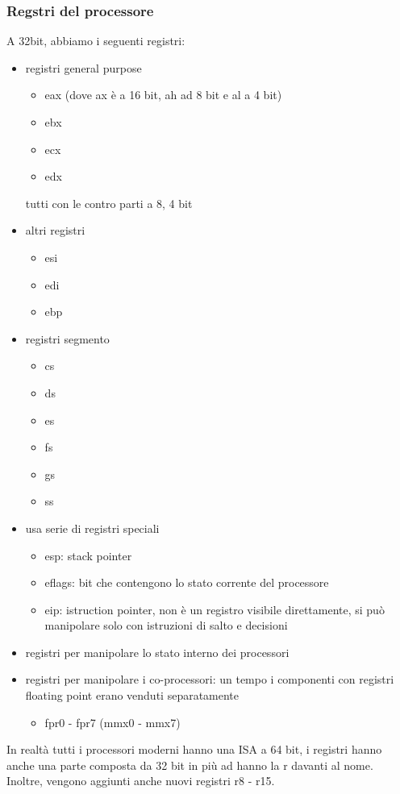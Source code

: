 \documentclass{article}
\begin{document}
\subsubsection{Regstri del processore}
A 32bit, abbiamo i seguenti registri:
\begin{itemize}
\item registri general purpose
\begin{itemize}
\item eax (dove ax è a 16 bit, ah ad 8 bit e al a 4 bit)
\item ebx
\item ecx
\item edx
\end{itemize}
tutti con le contro parti a 8, 4 bit
\item altri registri
\begin{itemize}
\item esi
\item edi
\item ebp
\end{itemize}
\item registri segmento
\begin{itemize}
\item cs
\item ds
\item es
\item fs
\item gs
\item ss
\end{itemize}
\item usa serie di registri speciali
\begin{itemize}
\item esp: stack pointer
\item eflags: bit che contengono lo stato corrente del processore
\item eip: istruction pointer, non è un registro visibile direttamente, si può manipolare solo con istruzioni di salto e decisioni
\end{itemize}
\item registri per manipolare lo stato interno dei processori
\item registri per manipolare i co-processori: un tempo i componenti con registri floating point erano venduti separatamente
\begin{itemize}
\item fpr0 - fpr7 (mmx0 - mmx7)
\end{itemize}
\end{itemize} 
In realtà tutti i processori moderni hanno una ISA a 64 bit, i registri hanno anche una parte composta da 32 bit in più ad hanno la r davanti al nome. Inoltre, vengono aggiunti anche nuovi registri r8 - r15.
\end{document}
